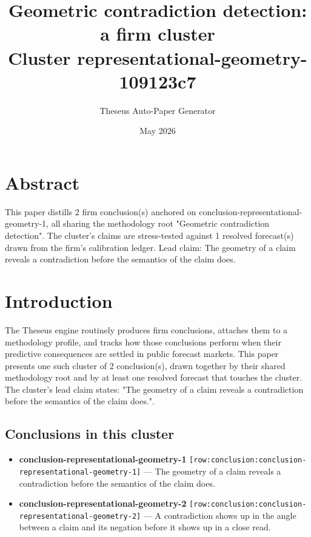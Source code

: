 \documentclass[11pt,letterpaper]{article}
\title{\textbf{Geometric contradiction detection: a firm cluster}\\[6pt]\large Cluster representational-geometry-109123c7}
\date{May 2026}
\author{Theseus Auto-Paper Generator}
\newcommand{\rowref}[1]{\texttt{\small[row:#1]}}
\begin{document}
\maketitle
\thispagestyle{empty}

\begin{center}
\end{center}

\vspace{1.5em}

\section*{Abstract}
This paper distills 2 firm conclusion(s) anchored on conclusion-representational-geometry-1, all sharing the methodology root "Geometric contradiction detection". The cluster's claims are stress-tested against 1 resolved forecast(s) drawn from the firm's calibration ledger. Lead claim: The geometry of a claim reveals a contradiction before the semantics of the claim does.

\section{Introduction}
The Theseus engine routinely produces firm conclusions, attaches them to a methodology profile, and tracks how those conclusions perform when their predictive consequences are settled in public forecast markets. This paper presents one such cluster of 2 conclusion(s), drawn together by their shared methodology root and by at least one resolved forecast that touches the cluster. The cluster's lead claim states: "The geometry of a claim reveals a contradiction before the semantics of the claim does.".

\subsection*{Conclusions in this cluster}
\begin{itemize}[leftmargin=1.5em]
  \item \textbf{conclusion-representational-geometry-1} \rowref{conclusion:conclusion-representational-geometry-1} --- The geometry of a claim reveals a contradiction before the semantics of the claim does.
  \item \textbf{conclusion-representational-geometry-2} \rowref{conclusion:conclusion-representational-geometry-2} --- A contradiction shows up in the angle between a claim and its negation before it shows up in a close read.
\end{itemize}
\end{document}
